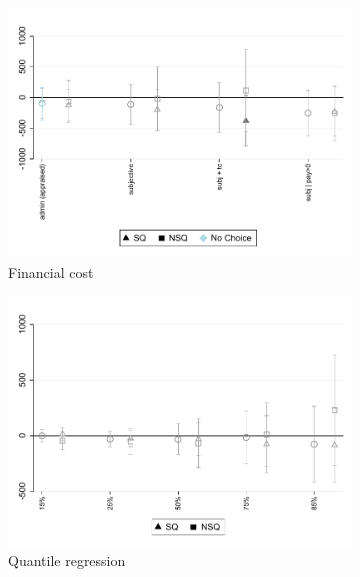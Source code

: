 \documentclass[11pt]{article}
\begin{document}
\begin{figure}[H]
    \caption{Voluntary commitment with promise” Treatment Effects}
    \label{fc_pro5}
    \begin{center}
    \begin{subfigure}{0.45\textwidth}
        \caption{Financial cost}
        \centering
        \includegraphics[width=\textwidth]{Figuras/fc_te_pro_5.pdf}
    \end{subfigure}
        \begin{subfigure}{0.45\textwidth}
        \caption{Quantile regression}
        \centering
        \includegraphics[width=\textwidth]{Figuras/fc_quantile_pro_5.pdf}
    \end{subfigure}
    \begin{subfigure}{0.45\textwidth}

\end{subfigure}
\end{center}
\end{figure}
\end{document}

